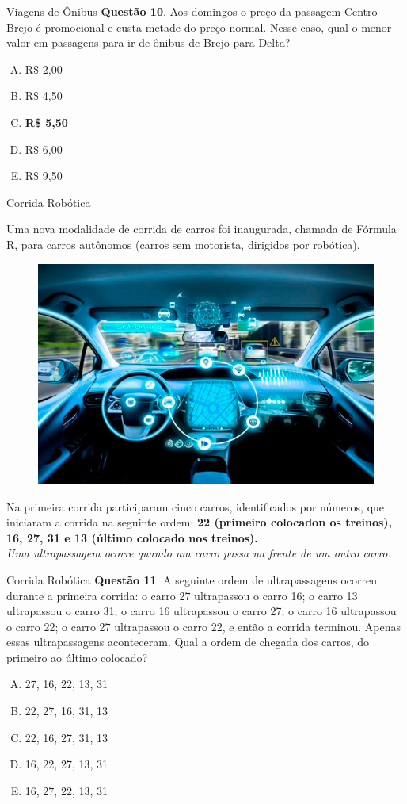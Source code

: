 \documentclass{beamer}
\begin{document}
\begin{frame}{Viagens de Ônibus}
\textbf{Questão 10}. Aos domingos o preço da passagem
Centro – Brejo é promocional e custa metade do
preço normal. Nesse caso, qual o menor valor em
passagens para ir de ônibus de Brejo para Delta?

\begin{enumerate}[(A)]
    \item R\$ 2,00
    \item R\$ 4,50
    \item \textbf{R\$ 5,50}
    \item R\$ 6,00
    \item R\$ 9,50
\end{enumerate}
\end{frame}
\begin{frame}{Corrida Robótica}


Uma nova modalidade de corrida de carros foi inaugurada, chamada de Fórmula R, para carros
autônomos (carros sem motorista, dirigidos por robótica). 
\begin{figure}[ht]
\centering
\includegraphics[width=.4\textwidth]{veiculo.jpg}
\label{fig:exampleFig2}
\end{figure}
Na primeira corrida participaram cinco carros, identificados por números, que iniciaram a corrida na seguinte ordem: \textbf{22 (primeiro colocadon os treinos), 16, 27, 31 e 13 (último colocado nos treinos).}
\\ 
\textit{Uma ultrapassagem ocorre quando um carro passa na frente de um outro carro.}
\end{frame}
\begin{frame}{Corrida Robótica}
\textbf{Questão 11}. A seguinte ordem de ultrapassagens ocorreu durante a primeira corrida: o carro 27 ultrapassou o carro 16; o carro 13 ultrapassou o carro 31; o carro 16 ultrapassou o carro 27; o carro 16 ultrapassou o carro 22; o carro 27 ultrapassou o carro 22, e então a corrida terminou. Apenas essas ultrapassagens aconteceram. Qual a ordem de chegada dos carros, do primeiro ao
último colocado?

\begin{enumerate}[(A)]
    \item 27, 16, 22, 13, 31
    \item 22, 27, 16, 31, 13
    \item 22, 16, 27, 31, 13
    \item 16, 22, 27, 13, 31
    \item 16, 27, 22, 13, 31
\end{enumerate}
\end{frame}
\end{document}
